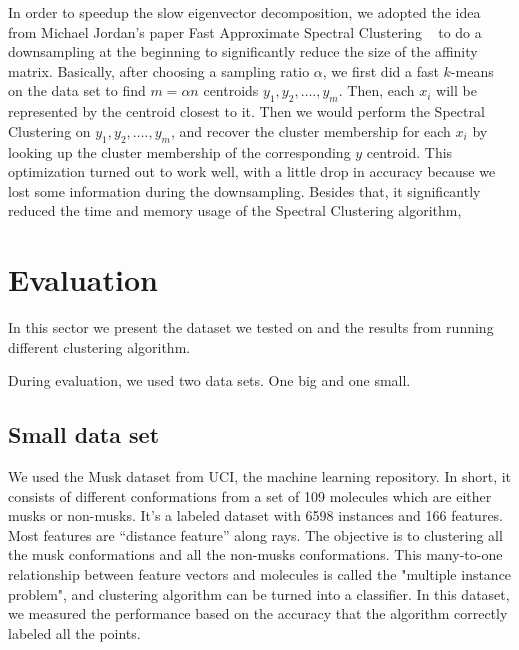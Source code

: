 \documentclass{acm_proc_article-sp}
\begin{document}
In order to speedup the slow eigenvector decomposition, we adopted the idea from Michael Jordan's paper Fast Approximate Spectral Clustering ~\cite{yan2009fast} to do a downsampling at the beginning to significantly reduce the size of the affinity matrix. Basically, after choosing a sampling ratio $\alpha$, we first did a fast $k$-means on the data set to find $m = \alpha n$ centroids $y_1, y_2, …., y_m$. Then, each $x_i$ will be represented by the centroid closest to it. Then we would perform the Spectral Clustering on $y_1, y_2, …., y_m$, and recover the cluster membership for each $x_i$ by looking up the cluster membership of the corresponding $y$ centroid. This optimization turned out to work well, with a little drop in accuracy because we lost some information during the downsampling. Besides that, it significantly reduced the time and memory usage of the Spectral Clustering algorithm,


\section{Evaluation}


In this sector we present the dataset we tested on and the results from running different clustering algorithm.

During evaluation, we used two data sets. One big and one small.
\\

\subsection{Small data set}
We used the Musk dataset from UCI, the machine learning repository. In short, it consists of different conformations from a set of 109 molecules which are either musks or non-musks. It’s a labeled dataset with 6598 instances and 166 features. Most features are “distance feature” along rays.
The objective is to clustering all the musk conformations and all the non-musks conformations. This many-to-one relationship between feature vectors and molecules is called the "multiple instance problem", and clustering algorithm can be turned into a classifier. In this dataset, we measured the performance based on the accuracy that the algorithm correctly labeled all the points.
\\
\end{document}
